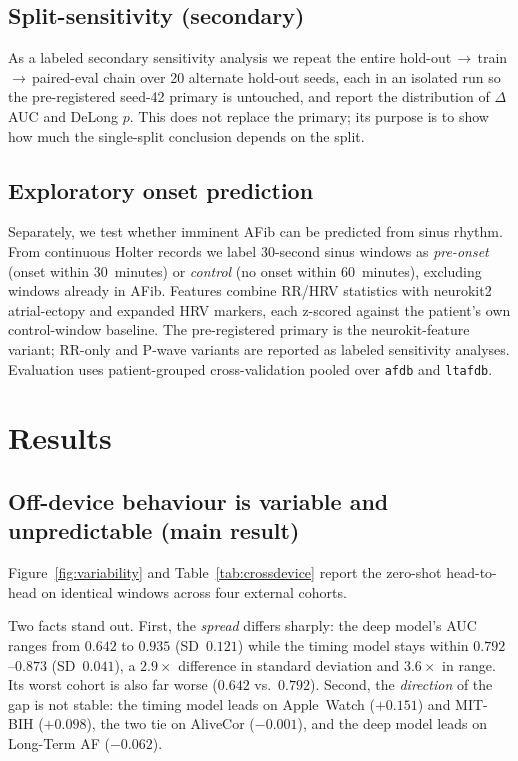 \subsection{Split-sensitivity (secondary)}
As a labeled secondary sensitivity analysis we repeat the entire
hold-out\,$\rightarrow$\,train\,$\rightarrow$\,paired-eval chain over 20 alternate
hold-out seeds, each in an isolated run so the pre-registered seed-42 primary is
untouched, and report the distribution of $\Delta$AUC and DeLong $p$. This does not
replace the primary; its purpose is to show how much the single-split conclusion
depends on the split.

\subsection{Exploratory onset prediction}
Separately, we test whether imminent AFib can be predicted from sinus rhythm. From
continuous Holter records we label 30-second sinus windows as \emph{pre-onset}
(onset within 30~minutes) or \emph{control} (no onset within 60~minutes), excluding
windows already in AFib. Features combine RR/HRV statistics with
neurokit2~\cite{makowski2021neurokit} atrial-ectopy and expanded HRV markers, each
z-scored against the patient's own control-window baseline. The pre-registered
primary is the neurokit-feature variant; RR-only and P-wave variants are reported
as labeled sensitivity analyses. Evaluation uses patient-grouped cross-validation
pooled over \texttt{afdb} and \texttt{ltafdb}.

\section{Results}

\subsection{Off-device behaviour is variable and unpredictable (main result)}
Figure~\ref{fig:variability} and Table~\ref{tab:crossdevice} report the zero-shot
head-to-head on identical windows across four external cohorts.

Two facts stand out. First, the \emph{spread} differs sharply: the deep model's
AUC ranges from $0.642$ to $0.935$ (SD~$0.121$) while the timing model stays
within $0.792$--$0.873$ (SD~$0.041$), a $2.9\times$ difference in standard
deviation and $3.6\times$ in range. Its worst cohort is also far worse
($0.642$ vs.\ $0.792$). Second, the \emph{direction} of the gap is not stable:
the timing model leads on Apple~Watch ($+0.151$) and MIT-BIH ($+0.098$), the two
tie on AliveCor ($-0.001$), and the deep model leads on Long-Term AF ($-0.062$).

